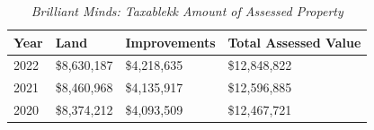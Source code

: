 \begin{table}[hbt]
\SingleSpacing%
  \caption[Brilliant Minds: Taxable Amount of Assessed Propery]{\textit{Brilliant Minds: Taxablekk Amount of Assessed Property}}\label{tab:brilliant-minds-taxable-amount}
  \begin{tabular}{llll}
    \toprule
   Year  & Land        & Improvements & Total Assessed Value \\
    \midrule
    2022 & \$8,630,187 & \$4,218,635  & \$12,848,822 \\
    2021 & \$8,460,968 & \$4,135,917  & \$12,596,885 \\
    2020 & \$8,374,212 & \$4,093,509  & \$12,467,721 \\
    \bottomrule
  \end{tabular}
\end{table}

